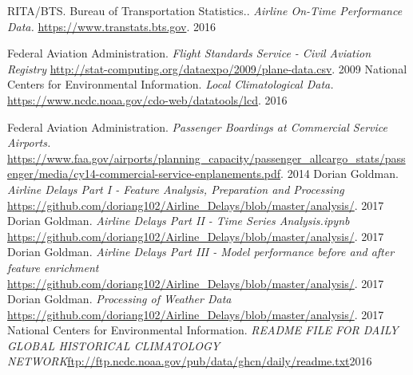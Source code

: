 \documentclass[twocolumn,showpacs,%
  nofootinbib,aps,superscriptaddress,%
  eqsecnum,prd,notitlepage,showkeys,10pt]{revtex4-1}
\begin{document}
  \begin{thebibliography}{1}

   RITA/BTS. Bureau of Transportation Statistics.. {\em Airline On-Time Performance Data.} \url{https://www.transtats.bts.gov}. 2016

    Federal Aviation Administration.  {\em Flight Standards Service - Civil Aviation Registry} \url{http://stat-computing.org/dataexpo/2009/plane-data.csv}. 2009
    National Centers for Environmental Information. {\em Local Climatological Data.} \url{ https://www.ncdc.noaa.gov/cdo-web/datatools/lcd}. 2016

   Federal Aviation Administration. {\em Passenger Boardings at Commercial Service Airports. } \url{https://www.faa.gov/airports/planning_capacity/passenger_allcargo_stats/passenger/media/cy14-commercial-service-enplanements.pdf}. 2014
   Dorian Goldman. {\em Airline Delays Part I - Feature Analysis, Preparation and Processing } \url{https://github.com/doriang102/Airline_Delays/blob/master/analysis/}. 2017
 Dorian Goldman. {\em Airline Delays Part II - Time Series Analysis.ipynb } \url{https://github.com/doriang102/Airline_Delays/blob/master/analysis/}. 2017
 Dorian Goldman. {\em Airline Delays Part III - Model performance before and after feature enrichment } \url{https://github.com/doriang102/Airline_Delays/blob/master/analysis/}. 2017
 Dorian Goldman. {\em Processing of Weather Data} \url{https://github.com/doriang102/Airline_Delays/blob/master/analysis/}. 2017
 National Centers for Environmental Information. {\em README FILE FOR DAILY GLOBAL HISTORICAL CLIMATOLOGY NETWORK}\url{ftp://ftp.ncdc.noaa.gov/pub/data/ghcn/daily/readme.txt}2016

  \end{thebibliography}
  
\end{document}
